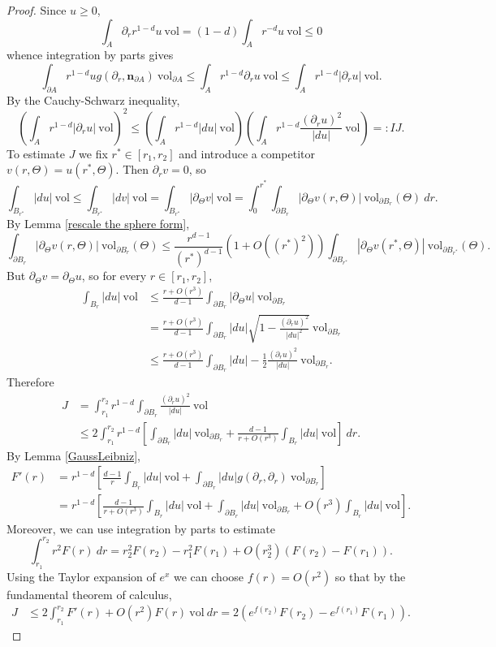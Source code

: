 \documentclass[reqno,12pt,letterpaper]{amsart}
\newcommand{\normal}{\mathbf n}
\newcommand{\vol}{\mathrm{vol}}
\theoremstyle{definition}
\numberwithin{equation}{section}
\begin{document}
\begin{proof}
Since $u \geq 0$,
$$\int_A \partial_r  r^{1 - d}u ~\vol = (1 - d)\int_A r^{-d}u ~\vol \leq 0$$
whence integration by parts gives
$$\int_{\partial A} r^{1 - d} u g(\partial_r, \normal_{\partial A}) ~\vol_{\partial A} \leq \int_A r^{1 - d} \partial_r u ~\vol \leq \int_A r^{1 - d} |\partial_r u| ~\vol.$$
By the Cauchy-Schwarz inequality,
\begin{equation}\label{monotonicity CauchySchwarz}
\left(\int_A r^{1 - d} |\partial_r u| ~\vol \right)^2 \leq \left(\int_A r^{1 - d}|du|~\vol\right)\left(\int_A r^{1 - d}\frac{(\partial_ru)^2}{|du|} ~\vol\right) =: IJ.
\end{equation}
To estimate $J$ we fix $r^* \in [r_1, r_2]$ and introduce a competitor $v(r, \Theta) = u(r^*, \Theta)$. Then $\partial_r v = 0$, so
$$\int_{B_{r^*}} |du| ~\vol \leq \int_{B_{r^*}} |dv| ~\vol = \int_{B_{r^*}} |\partial_\Theta v| ~\vol = \int_0^{r^*} \int_{\partial B_r} |\partial_\Theta v(r, \Theta)| ~\vol_{\partial B_r}(\Theta) ~dr.$$
By Lemma \ref{rescale the sphere form},
$$\int_{\partial B_r} |\partial_\Theta v(r, \Theta)| ~\vol_{\partial B_r}(\Theta) \leq \frac{r^{d - 1}}{(r^*)^{d - 1}}(1 + O((r^*)^2)) \int_{\partial B_{r^*}} |\partial_\Theta v(r^*, \Theta)| ~\vol_{\partial B_{r^*}}(\Theta).$$
But $\partial_\Theta v = \partial_\Theta u$, so for every $r \in [r_1, r_2]$,
\begin{align*}
\int_{B_r} |du| ~\vol &\leq \frac{r + O(r^3)}{d - 1} \int_{\partial B_r} |\partial_\Theta u| ~\vol_{\partial B_r}\\
&= \frac{r + O(r^3)}{d - 1} \int_{\partial B_r} |du| \sqrt{1 - \frac{(\partial_r u)^2}{|du|^2}} ~\vol_{\partial B_r} \\
&\leq \frac{r + O(r^3)}{d - 1} \int_{\partial B_r} |du| - \frac{1}{2} \frac{(\partial_r u)^2}{|du|} ~\vol_{\partial B_r}.
\end{align*}
Therefore
\begin{align*}
J &= \int_{r_1}^{r_2} r^{1 - d} \int_{\partial B_r} \frac{(\partial_r u)^2}{|du|} ~\vol \\
&\leq 2 \int_{r_1}^{r_2} r^{1 - d} \left[\int_{\partial B_r} |du| ~\vol_{\partial B_r} + \frac{d - 1}{r + O(r^3)} \int_{B_r} |du| ~\vol\right] ~dr.
\end{align*}
By Lemma \ref{GaussLeibniz},
\begin{align*}
F'(r) &= r^{1 - d}\left[\frac{d - 1}{r} \int_{B_r} |du| ~\vol + \int_{\partial B_r} |du| g(\partial_r, \partial_r) ~\vol_{\partial B_r}\right]\\
&= r^{1 - d}\left[\frac{d - 1}{r + O(r^3)} \int_{B_r} |du| ~\vol + \int_{\partial B_r} |du| ~\vol_{\partial B_r} + O(r^3) \int_{B_r}|du| ~\vol\right].
\end{align*}
Moreover, we can use integration by parts to estimate
$$\int_{r_1}^{r_2} r^2 F(r) ~dr = r_2^2 F(r_2) - r_1^2 F(r_1) + O(r_2^3)(F(r_2) - F(r_1)).$$
Using the Taylor expansion of $e^x$ we can choose $f(r) = O(r^2)$ so that by the fundamental theorem of calculus,
\begin{align*}
J &\leq 2\int_{r_1}^{r_2} F'(r) + O(r^2)F(r) ~\vol ~dr = 2(e^{f(r_2)} F(r_2) - e^{f(r_1)} F(r_1)).
\end{align*}


\end{proof}
\end{document}
